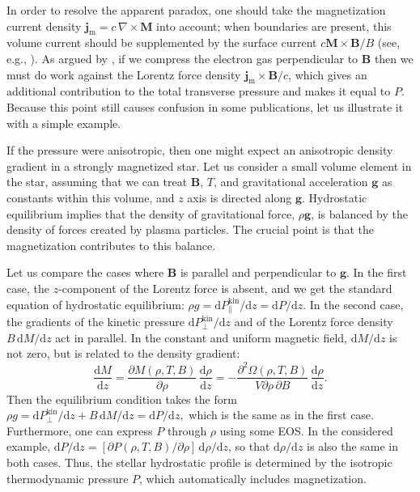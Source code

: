 \documentclass[traditabstract]{aa}
\newcommand{\beq}{\begin{equation}}
\newcommand{\eeq}{\end{equation}}
\newcommand{\dd}{\mathrm{d}} %
\begin{document}
{In order to resolve the apparent paradox, one should take the
magnetization current density $\bm{j}_\mathrm{m}=c\,\nabla
\times {\bm{M}}$ into account; when boundaries are present,
this volume current
should be supplemented by the surface current
$c\bm{M}\times\bm{B}/B$ (see, e.g., \citealp{Griffith}).  As
argued by \citet{BlandfordHernquist}, if we compress the
electron gas perpendicular to $\bm{B}$ then we must do work
against the Lorentz force density
$\bm{j}_\mathrm{m}\times\bm{B}/c$, which gives an additional
contribution to the total transverse pressure and makes it
equal to $P$. Because this point still causes confusion in
some publications, let us illustrate it with a simple
example.

If the  pressure were anisotropic, then one might expect an
anisotropic density gradient in a strongly magnetized star.
Let us consider a small volume element in the star, assuming
that we can treat $\bm{B}$, $T$, and gravitational
acceleration $\bm{g}$ as constants within this volume, and
$z$ axis is directed along $\bm{g}$. Hydrostatic equilibrium
implies that the density of gravitational force, $\rho
\bm{g}$, is balanced by the density of forces created by
plasma particles. The crucial point is that the
magnetization contributes to this balance.

Let us compare the cases where $\bm{B}$ is parallel and
perpendicular to $\bm{g}$. In the first case, the
$z$-component of the Lorentz force is absent, and we get the
standard equation of hydrostatic equilibrium: $\rho g=\dd
P_\|^\mathrm{kin}/\dd z=\dd P/\dd z$. In the second case,
the gradients of the kinetic pressure $\dd
P_\perp^\mathrm{kin}/\dd z$  and of the Lorentz force
density $B\,\dd M/\dd z$ act in parallel. In the constant
and uniform magnetic field, $\dd M/\dd z$ is not zero, but
is related to the density gradient:
%
\beq
 \frac{\dd M}{\dd z}=\frac{\partial M(\rho,T,B)}{\partial\rho}\,
    \frac{\dd \rho}{\dd z}
    = - \frac{\partial^2\Omega(\rho,T,B)
       }{ V \partial\rho\, \partial B}\,
    \frac{\dd \rho}{\dd z} .
\label{dMdz}
\eeq
%
Then the equilibrium condition takes the form
$
 \rho g = {\dd P_\perp^\mathrm{kin}}/{\dd z}
    + B\,{\dd M}/{\dd z} ={\dd P}/{\dd z},
$
which is the same as in the first case. Furthermore, one can
express $P$ through $\rho$ using some EOS. In the considered
example, $\dd P/\dd z = [\partial
P(\rho,T,B)/\partial\rho]\,\dd \rho/\dd z$, so that $\dd
\rho/\dd z$ is also the same in both cases. Thus, the
stellar hydrostatic profile is determined by the isotropic
thermodynamic pressure $P$, which automatically includes
magnetization. 

}
\end{document}
